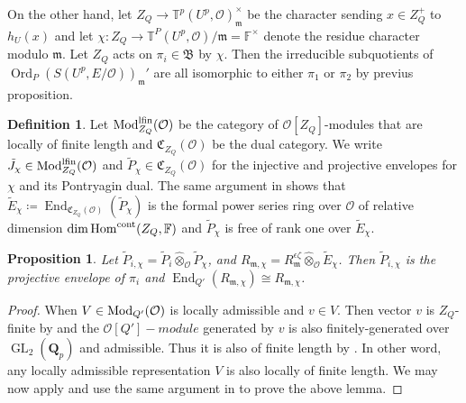 \documentclass[leqno]{amsart}
\newcommand{\fF}{\mathbb{F}} %
\newcommand{\TT}{\mathbb{T}} %
\newcommand{\lfMod}{\textnormal{Mod}^{\textnormal{lfin}}}
\DeclareMathOperator{\Mod}{\textnormal{Mod}}
\newcommand{\B}{\mathfrak B}
\newcommand{\fC}{\mathfrak C}
\DeclareMathOperator{\Ord}{Ord}
\newcommand{\cont}{\textnormal{cont}}
\DeclareMathOperator{\GL}{GL}
\newcommand{\Qp}{\mathbf{Q}_p}
\newcommand{\oo}{\mathcal{O}} %
\newcommand{\fm}{\mathfrak{m}}
\DeclareMathOperator{\End}{End}
\DeclareMathOperator{\Hom}{Hom}
\newtheorem{prop}[thm]{Proposition}
\theoremstyle{definition}
\newtheorem{defn}[thm]{Definition}
\theoremstyle{remark}
\begin{document}
On the other hand,
let $Z_Q\to \TT^p(U^p,\oo)_{\fm}^{\times}$
be the character
sending $x\in Z_Q^+$ to $h_U(x)$
and let 
$\chi\colon Z_Q\to \TT^P(U^p,\oo)/\fm=\fF^\times$
denote the residue character modulo $\fm$.
Let $Z_Q$ acts on $\pi_i\in \B$ by $\chi$.
Then the irreducible subquotients
of  $\Ord_P(S(U^p,E/\oo))_{\fm}'$
are all isomorphic to either $\pi_1$ or  $\pi_2$
by previus proposition.


\begin{defn}

Let $\lfMod_{Z_Q}(\oo)$
be the category of $\oo[Z_Q]$-modules
that are locally of finite length
and  $\fC_{Z_Q}(\oo)$ be the dual category.
We write 
$\tilde{J}_\chi\in \lfMod_{Z_Q}(\oo)$ and 
$\tilde{P}_\chi\in \fC_{Z_Q}(\oo)$
for the injective and projective envelopes
for $\chi$ and its Pontryagin dual.
The same argument in \cite[Prop 3.34]{pask}
shows that 
$\tilde{E}_\chi\coloneqq 
\End_{\fC_{Z_Q}(\oo)}(\tilde{P}_\chi)$
is the formal power series ring over $\oo$ 
of relative dimension $\dim\Hom^{\cont}(Z_Q,\fF)$
and $\tilde{P}_\chi$ is free of rank one over 
$\tilde{E}_\chi$.

\end{defn}


\begin{prop}\label{prop:envelope}
	Let $\tilde{P}_{i,\chi}=
	\tilde{P}_i\hat{\otimes}_{\oo}\tilde{P}_\chi$,
	and $R_{\fm, \chi}=R_\fm^{\epsilon\zeta}
	\hat{\otimes}_{\oo}\tilde{E}_\chi$.
	Then $\tilde{P}_{i,\chi}$
	is the projective envelope
	of $\pi_i$ and 
	$\End_{Q'}(R_{\fm, \chi}) \cong R_{\fm,\chi}$.
\end{prop}
\begin{proof}
	When $V\in \Mod_{Q'}(\oo)$
	is locally admissible and $v\in V$.
	Then  vector 
	$v$ is  $Z_Q$-finite by \cite[Lem 2.3.5]{emeI}
	and the $\oo[Q']-module$
	generated by $v$ is also 
	finitely-generated over  $\GL_2(\Qp)$
	and admissible.
	Thus it is also of finite length 
	by \cite[Thm 2.3.8]{emeI}.
	In other word,
	any locally admissible representation $V$
	is also locally of finite length.
	We may now apply \cite[Lem B.6]{GN}
	and use the same argument in \cite[Lem B.8]{GN}
	to prove the above lemma.
\end{proof}
\end{document}
